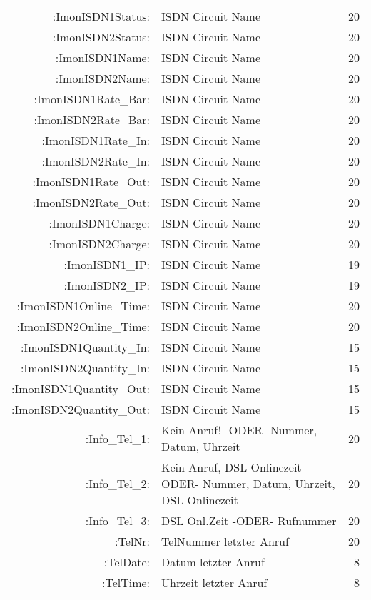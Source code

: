 \begin{description}
\begin{small}
\begin{center}
\begin{longtable}{rp{7cm}r}
       :ImonISDN1Status: &       ISDN Circuit Name            &  20 \\
       :ImonISDN2Status: &       ISDN Circuit Name            &  20 \\
         :ImonISDN1Name: &       ISDN Circuit Name            &  20 \\
         :ImonISDN2Name: &       ISDN Circuit Name            &  20 \\
    :ImonISDN1Rate\_Bar: &       ISDN Circuit Name            &  20 \\
    :ImonISDN2Rate\_Bar: &       ISDN Circuit Name            &  20 \\
     :ImonISDN1Rate\_In: &       ISDN Circuit Name            &  20 \\
     :ImonISDN2Rate\_In: &       ISDN Circuit Name            &  20 \\
    :ImonISDN1Rate\_Out: &       ISDN Circuit Name            &  20 \\
    :ImonISDN2Rate\_Out: &       ISDN Circuit Name            &  20 \\
       :ImonISDN1Charge: &       ISDN Circuit Name            &  20 \\
       :ImonISDN2Charge: &       ISDN Circuit Name            &  20 \\
         :ImonISDN1\_IP: &       ISDN Circuit Name            &  19 \\
         :ImonISDN2\_IP: &       ISDN Circuit Name            &  19 \\
 :ImonISDN1Online\_Time: &       ISDN Circuit Name            &  20 \\
 :ImonISDN2Online\_Time: &       ISDN Circuit Name            &  20 \\
 :ImonISDN1Quantity\_In: &       ISDN Circuit Name            &  15 \\
 :ImonISDN2Quantity\_In: &       ISDN Circuit Name            &  15 \\
:ImonISDN1Quantity\_Out: &       ISDN Circuit Name            &  15 \\
:ImonISDN2Quantity\_Out: &       ISDN Circuit Name            &  15 \\

          :Info\_Tel\_1: &       Kein Anruf! -ODER- Nummer, Datum, Uhrzeit      &  20 \\
          :Info\_Tel\_2: &       Kein Anruf, DSL Onlinezeit -ODER- Nummer, Datum, Uhrzeit, DSL Onlinezeit    &  20 \\
          :Info\_Tel\_3: &       DSL Onl.Zeit -ODER- Rufnummer &  20 \\
                 :TelNr: &       TelNummer letzter Anruf     &  20 \\
               :TelDate: &       Datum letzter Anruf         &   8 \\
               :TelTime: &       Uhrzeit letzter Anruf       &   8 \\
       

\end{longtable}
\end{center}
\end{small}
\end{description}
